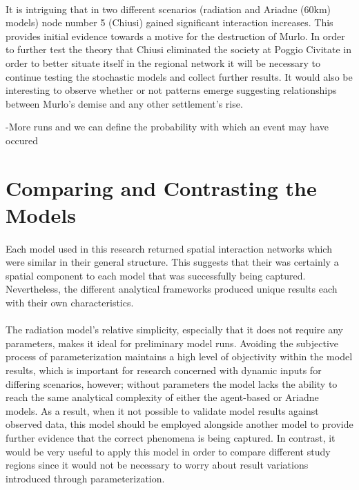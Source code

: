 \documentclass[12pt,a4paper]{thesis}
\begin{document}
\paragraph{}
It is intriguing that in two different scenarios (radiation and Ariadne (60km) models) node number 5 (Chiusi) gained significant interaction increases. This provides initial evidence towards a motive for the destruction of Murlo. In order to further test the theory that Chiusi eliminated the society at Poggio Civitate in order to better situate itself in the regional network it will be necessary to continue testing the stochastic models and collect further results. It would also be interesting to observe whether or not patterns emerge suggesting relationships between Murlo's demise and any other settlement's rise.

-More runs and we can define the probability with which an event may have occured  

\section{Comparing and Contrasting the Models}
\paragraph{}
Each model used in this research returned spatial interaction networks which were similar in their general structure. This suggests that their was certainly a spatial component to each model that was successfully being captured. Nevertheless, the different analytical frameworks produced unique results each with their own characteristics.

\paragraph{}
The radiation model's relative simplicity, especially that it does not require any parameters, makes it ideal for preliminary model runs. Avoiding the subjective process of parameterization maintains a high level of objectivity within the model results, which is important for research concerned with dynamic inputs for differing scenarios, however; without parameters the model lacks the ability to reach the same analytical complexity of either the agent-based or Ariadne models. As a result, when it not possible to validate model results against observed data, this model should be employed alongside another model to provide further evidence that the correct phenomena is being captured. In contrast, it would be very useful to apply this model in order to compare different study regions since it would not be necessary to worry about result variations introduced through parameterization. 
\end{document}
